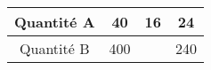 \begin{tabular}{|c|c|c|c|}
\hline
Quantité A & 40 & 16 & 24 \\ \hline
Quantité B & 400 & \kern1cm & 240 \\ \hline
\end{tabular}

